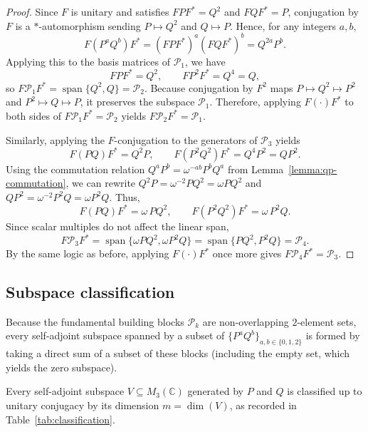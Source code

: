 \begin{proof}
    Since \( F \) is unitary and satisfies \( FPF^* = Q^2 \) and \(
    FQF^* = P \),
    conjugation by \( F \) is a \( * \)-automorphism sending
    \( P \mapsto Q^2 \) and \( Q \mapsto P \). Hence, for any
    integers \( a,b \),
    \[
        F(P^aQ^b)F^* = (FPF^*)^a(FQF^*)^b = Q^{2a}P^b.
    \]
    Applying this to the basis matrices of \( \mathcal{P}_1 \), we have
    \[
        FPF^* = Q^2, \qquad FP^2F^* = Q^4 = Q,
    \]
    so \( F\mathcal{P}_1F^* = \operatorname{span}\{Q^2,Q\} = \mathcal{P}_2 \).
    Because conjugation by \( F^2 \) maps \( P \mapsto Q^2 \mapsto
    P^2 \) and \( P^2 \mapsto Q \mapsto P \), it preserves the
    subspace \( \mathcal{P}_1 \). Therefore, applying \( F(\cdot)F^*
    \) to both sides of \( F\mathcal{P}_1F^* = \mathcal{P}_2 \)
    yields \( F\mathcal{P}_2F^* = \mathcal{P}_1 \).

    Similarly, applying the \( F \)-conjugation to the generators of
    \( \mathcal{P}_3 \) yields
    \[
        F(PQ)F^* = Q^2P, \qquad F(P^2Q^2)F^* = Q^4P^2 = QP^2.
    \]
    Using the commutation relation
    \( Q^aP^b = \omega^{-ab}P^b Q^a \) from
    Lemma~\ref{lemma:qp-commutation}, we can rewrite
    \( Q^2P = \omega^{-2}PQ^2 = \omega PQ^2 \) and
    \( QP^2 = \omega^{-2}P^2Q = \omega P^2Q \). Thus,
    \[
        F(PQ)F^* = \omega\, PQ^2, \qquad F(P^2Q^2)F^* = \omega\, P^2Q.
    \]
    Since scalar multiples do not affect the linear span,
    \[
        F\mathcal{P}_3F^*
        = \operatorname{span}\{\omega PQ^2, \omega P^2Q\}
        = \operatorname{span}\{PQ^2,P^2Q\} = \mathcal{P}_4.
    \]
    By the same logic as before, applying \( F(\cdot)F^* \) once more gives
    \( F\mathcal{P}_4F^* = \mathcal{P}_3 \).
\end{proof}

\subsection{Subspace classification}
\label{subsec:subspace-classification}

Because the fundamental building blocks \( \mathcal{P}_k \) are
non-overlapping \( 2 \)-element sets, every self-adjoint subspace
spanned by a subset of \( \{P^aQ^b\}_{a,b \in \{0,1,2\}} \) is formed
by taking a direct sum of a subset of these blocks (including the
empty set, which yields the zero subspace).

\begin{proposition}
    \label{prop:subspace-classification-by-dimension}
    Every self-adjoint subspace \( V \subseteq M_{3}(\mathbb{C})
    \) generated by
    \( P \) and \( Q \) is classified up to unitary conjugacy by its
    dimension \( m = \dim(V) \),
    as recorded in Table~\ref{tab:classification}.
\end{proposition}

